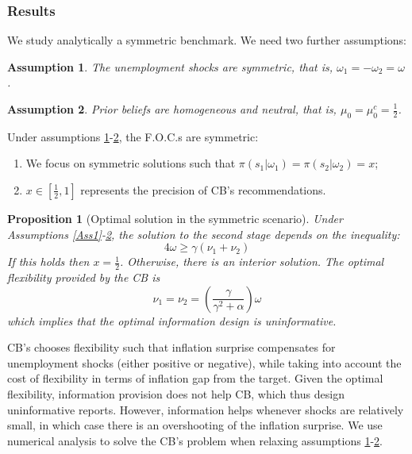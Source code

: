 \documentclass{beamer}
\newtheorem{assumption}{Assumption}
\newtheorem{proposition}{Proposition}
\begin{document}
\begin{frame}[allowframebreaks]
    \frametitle{Results}
    We study analytically a symmetric benchmark.
    \vskip10pt
    We need two further assumptions:
    \begin{assumption}
        \label{Ass3}
        The unemployment shocks are symmetric, that is, $\omega_1=-\omega_2=\omega$.
    \end{assumption}
    \begin{assumption}
        \label{Ass4}
        Prior beliefs are homogeneous and neutral, that is, $\mu_0=\mu_0^c=\frac{1}{2}$.
    \end{assumption}
    Under assumptions \ref{Ass3}-\ref{Ass4}, the F.O.C.s are symmetric:
    \begin{enumerate}
        \item We focus on symmetric solutions such that $\pi(s_1|\omega_1)=\pi(s_2|\omega_2)=x$;
        \item $x\in\left[\frac{1}{2},1\right]$ represents the precision of CB's recommendations.
    \end{enumerate}
    \begin{proposition}[Optimal solution in the symmetric scenario]
    \label{Prop2}
        Under Assumptions \ref{Ass1}-\ref{Ass4}, the solution to the second stage depends on the inequality:
    \begin{equation}
    \label{threshold}
        4\omega\geq\gamma(\nu_1+\nu_2)
    \end{equation}
    If this holds then $x=\frac{1}{2}$. Otherwise, there is an interior solution. 
    \vskip10pt
    The optimal flexibility provided by the CB is
    \begin{equation}
        \nu_1=\nu_2=\left(\frac{\gamma}{\gamma^2+\alpha}\right)\omega
    \end{equation}
    which implies that the optimal information design is uninformative.
    \end{proposition}
    \framebreak
    CB's chooses flexibility such that inflation surprise compensates for unemployment shocks (either positive or negative), while taking into account the cost of flexibility in terms of inflation gap from the target. 
    \vskip10pt
    Given the optimal flexibility, information provision does not help CB, which thus design uninformative reports. 
    \vskip10pt
    However, information helps whenever shocks are relatively small, in which case there is an overshooting of the inflation surprise.
    \vskip10pt
    \framebreak
    We use numerical analysis to solve the CB's problem when relaxing assumptions \ref{Ass3}-\ref{Ass4}.

\end{frame}
\end{document}
